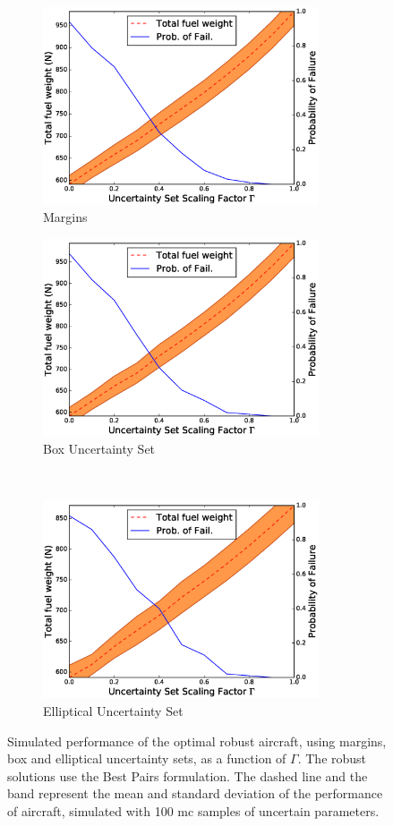 \begin{figure}[ht]
    \centering
    \captionsetup{justification=centering, font=small}
    \begin{subfigure}{0.49\textwidth}
        \centering
        \includegraphics[height=2.3in]{marginspof.eps}
         \caption{Margins}
    \end{subfigure}%
    \begin{subfigure}{0.49\textwidth}
        \centering
        \includegraphics[height=2.3in]{box_best_pairs.eps}
         \caption{Box Uncertainty Set}
    \end{subfigure}%
    \\
    \begin{subfigure}{0.49\textwidth}
        \centering
        \includegraphics[height=2.3in]{ell_best_pairs.eps}
         \caption{Elliptical Uncertainty Set}
    \end{subfigure}
    \caption{Simulated performance of the optimal robust aircraft, using margins, box and elliptical uncertainty sets,
    as a function of $\Gamma$. The robust solutions use the Best Pairs formulation.
    The dashed line and the band represent the mean and standard deviation of the performance
    of aircraft, simulated with 100 \gls{mc} samples of uncertain parameters.}
    \label{fig:probOfFailure}
\end{figure}

